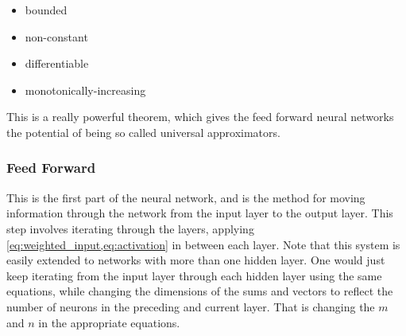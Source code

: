 \documentclass[10pt, twocolumn]{article}
\begin{document}
\begin{multicols}{2}
\begin{itemize}
    \item bounded
    \item non-constant
    \item differentiable
    \item monotonically-increasing
\end{itemize}
\end{multicols}

This is a really powerful theorem, which gives the feed forward neural networks the potential of being so called universal approximators.

\subsubsection{Feed Forward}
\label{subsubsec:Theory/NN/FFNN}
This is the first part of the neural network, and is the method for moving information through the network from the input layer to the output layer. This step involves iterating through the layers, applying \cref{eq:weighted_input,eq:activation} in between each layer. Note that this system is easily extended to networks with more than one hidden layer. One would just keep iterating from the input layer through each hidden layer using the same equations, while changing the dimensions of the sums and vectors to reflect the number of neurons in the preceding and current layer. That is changing the $m$ and $n$ in the appropriate equations.
\end{document}
